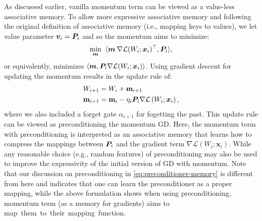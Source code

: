 As discussed earlier, vanilla momentum term can be viewed as a value-less associative memory. 
To allow more expressive associative memory  and following the original definition of associative memory (i.e., mapping keys to values), we {let value parameter $\boldsymbol{v}_i = \boldsymbol{P}_i$} and so the momentum aims to minimize:
\begin{align}
    \min_{\boldsymbol{m}}\;\;\langle \boldsymbol{m} \: \nabla \mathcal{L}(W_i;\boldsymbol{x}_i)^{\top}, \boldsymbol{P}_i \rangle,
\end{align}
or equivalently, minimizes $\langle \boldsymbol{m}, \boldsymbol{P}_i  \nabla \mathcal{L}(W_i;\boldsymbol{x}_i)\rangle$.  Using gradient descent for updating the momentum
results in the update rule of:
\begin{align}\nonumber
    &W_{i+1} = W_i + \mathbf{m}_{i+1}\\ \label{eq:momentum-p}
    &\mathbf{m}_{i+1} =   \mathbf{m}_{i} - \eta_i \boldsymbol{P}_i  \nabla \mathcal{L}\left(W_{i};\boldsymbol{x}_i\right),
\end{align}
where we also included a forget gate $\alpha_{i+1}$ for fogetting the past.
This update rule can be viewed as preconditioning the momentum GD. Here,  the momentum term with preconditioning is interpreted as an associative memory that learns how to compress the mappings between $\boldsymbol{P}_i$ and the gradient term $\nabla \mathcal{L}(W_i;\boldsymbol{x}_i)$. 
While any reasonable choice (e.g., random features) of preconditioning may also be used to improve the expressivity of the initial version of GD with momentum. 
Note that our discussion on preconditioning in \autoref{eq:preconditioner-memory} is different from here and indicates that one can learn the preconditioner as a proper mapping, while the above formulation shows when using preconditioning, momentum term (as a memory for gradients) aims to map~them~to~their~mapping~function. 

